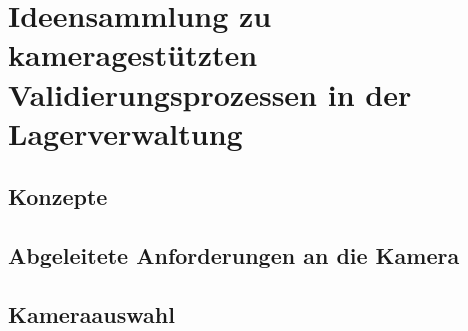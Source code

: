 \documentclass[11pt]{scrartcl}
\begin{document}
    \newpage
    \section {Ideensammlung zu kameragestützten Validierungsprozessen in der Lagerverwaltung}

    \subsection {Konzepte}

    \subsection {Abgeleitete Anforderungen an die Kamera}

    \subsection {Kameraauswahl}
\end{document}
